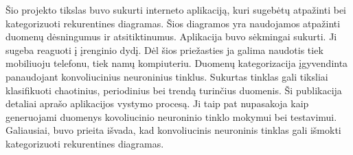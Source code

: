 Šio projekto tikslas buvo sukurti interneto aplikaciją, kuri sugebėtų atpažinti bei kategorizuoti rekurentines diagramas.
Šios diagramos yra naudojamos atpažinti duomenų  dėsningumus ir atsitiktinumus.
Aplikacija buvo sėkmingai sukurti. Ji sugeba reaguoti į įrenginio dydį.
Dėl šios priežasties ja galima naudotis tiek mobiliuoju telefonu, tiek namų kompiuteriu.
Duomenų kategorizacija įgyvendinta panaudojant konvoliucinius neuroninius tinklus.
Sukurtas tinklas gali tiksliai klasifikuoti chaotinius, periodinius bei trendą turinčius duomenis.
Ši publikacija detaliai aprašo aplikacijos vystymo procesą.
Ji taip pat nupasakoja kaip generuojami duomenys kovoliucinio neuroninio tinklo mokymui bei testavimui.
Galiausiai, buvo prieita išvada, kad konvoliucinis neuroninis tinklas gali išmokti kategorizuoti rekurentines diagramas. 